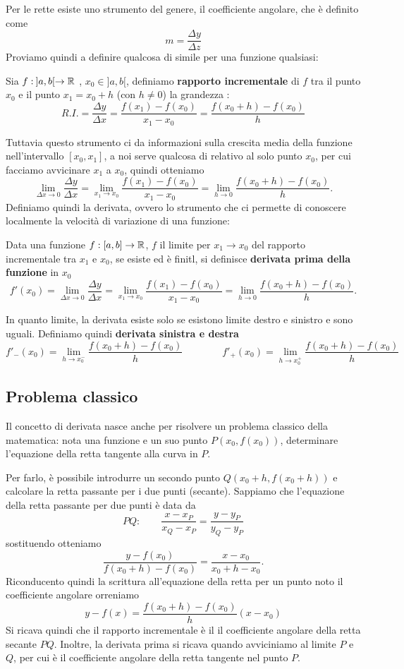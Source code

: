 \documentclass{book}     %
\begin{document}
Per le rette esiste uno strumento del genere, il coefficiente angolare, che è definito come 
\[m=\frac{\Delta y}{\Delta z}\]
Proviamo quindi a definire qualcosa di simile per una funzione qualsiasi:
\begin{boxdef}
    Sia $f:\:]a,b[\to \mathbb{R}$ , $x_0\in ]a,b[$, definiamo \textbf{rapporto incrementale} di $f$ tra il punto $x_0$ e il punto $x_1=x_0+h$ (con $h\neq 0$) la grandezza :
    \[R.I.=\frac{\Delta y}{\Delta x}=\frac{f(x_1)-f(x_0)}{x_1-x_0}=\frac{f(x_0+h)-f(x_0)}{h}\]
\end{boxdef}
Tuttavia questo strumento ci da informazioni sulla crescita media della funzione nell'intervallo $[x_0,x_1]$, a noi serve qualcosa di relativo al solo punto $x_0$, per cui facciamo avvicinare $x_1$ a $x_0$, quindi otteniamo
\[\lim_{\Delta x \to 0}\frac{\Delta y}{\Delta x}=\lim_{x_1\to x_0}\frac{f(x_1)-f(x_0)}{x_1-x_0}=\lim_{h\to 0}\frac{f(x_0+h)-f(x_0)}{h}.\]
Definiamo quindi la derivata, ovvero lo strumento che ci permette di conoscere localmente la velocità di variazione di una funzione:
\begin{boxdef}[Derivata]
    Data una funzione $f:[a,b]\to\mathbb{R}$, $f$ il limite per $x_1\to x_0$ del rapporto incrementale tra $x_1$ e $x_0$, se esiste ed è finitl, si definisce \textbf{derivata prima della funzione}  in $x_0$
    \[f'(x_0)=\lim_{\Delta x \to 0}\frac{\Delta y}{\Delta x}=\lim_{x_1\to x_0}\frac{f(x_1)-f(x_0)}{x_1-x_0}=\lim_{h\to 0}\frac{f(x_0+h)-f(x_0)}{h}.\]
\end{boxdef}
In quanto limite, la derivata esiste solo se esistono limite destro e sinistro e sono uguali. Definiamo quindi \textbf{derivata sinistra e destra}
\[f'_-(x_0)=\lim_{h\to x_0^-}\frac{f(x_0+h)-f(x_0)}{h}\qquad \qquad f'_+(x_0)=\lim_{h\to x_0^+}\frac{f(x_0+h)-f(x_0)}{h}\]
\subsection{Problema classico}
Il concetto di derivata nasce anche per risolvere un problema classico della matematica: nota una funzione e un suo punto $P(x_0,f(x_0))$, determinare l'equazione della retta tangente alla curva in $P$. 

Per farlo, è possibile introdurre un secondo punto $Q(x_0+h, f(x_0+h))$ e calcolare la retta passante per i due punti (secante). Sappiamo che l'equazione della retta passante per due punti è data da
\[PQ:\qquad \frac{x-x_P}{x_Q-x_P}=\frac{y-y_P}{y_Q-y_P}\]
sostituendo otteniamo
\[\frac{y-f(x_0)}{f(x_0+h)-f(x_0)}=\frac{x-x_0}{x_0+h-x_0}.\]
Riconducento quindi la scrittura all'equazione della retta per un punto noto il coefficiente angolare orreniamo
\[y-f(x)=\frac{f(x_0+h)-f(x_0)}{h}(x-x_0)\]
Si ricava quindi che il rapporto incrementale è il il coefficiente angolare della retta secante $PQ$. Inoltre, la derivata prima si ricava quando avviciniamo al limite $P$ e $Q$, per cui è il coefficiente angolare della retta tangente nel punto $P$.
\end{document}
